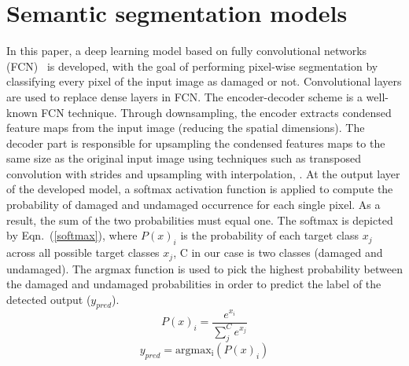 \documentclass[runningheads]{llncs}
\begin{document}
\section{Semantic segmentation models}
\label{section:semantic_segmentation}
In this paper, a deep learning model based on fully convolutional networks (FCN)~\cite{shelhamer2017fully} is developed, with the goal of performing pixel-wise segmentation by classifying every pixel of the input image as damaged or not. 
Convolutional layers are used to replace dense layers in FCN.
The encoder-decoder scheme is a well-known FCN technique.
Through downsampling, the encoder extracts condensed feature maps from the input image (reducing the spatial dimensions).
The decoder part is responsible for upsampling the condensed features maps to the same size as the original input image using techniques such as transposed convolution with strides and upsampling with interpolation, .
At the output layer of the developed model, a softmax activation function is applied to compute the probability of damaged and undamaged occurrence for each single pixel.
As a result, the sum of the two probabilities must equal one.
The softmax is depicted by Eqn.~(\ref{softmax}), where \(P(x)_{i}\) is the probability of each target class  \(x_{j}\) across all possible target classes \(x_{j}\), C in our case is two classes (damaged and undamaged).
The \(\mathrm{argmax}\) function is used to pick the highest probability between the damaged and undamaged probabilities in order to predict the label of the detected output (\(y_{pred}\)).
\begin{equation}
	P(x)_{i} = \frac{e^{x_{i}}}{\sum_{j}^{C} e^{x_{j}}}
	\label{softmax}
\end{equation} 
\begin{equation}
	y_{pred} = \mathrm{argmax_{i}}\left( P(x)_{i} \right)
	\label{argmax}
\end{equation}
\end{document}
